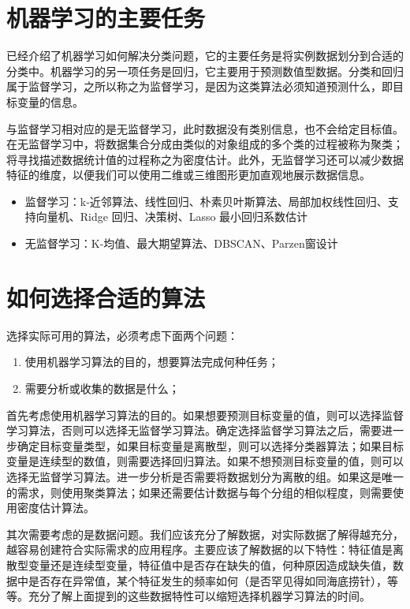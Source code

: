 \section{机器学习的主要任务}
已经介绍了机器学习如何解决分类问题，它的主要任务是将实例数据划分到合适的分类中。机器学习的另一项任务是回归，它主要用于预测数值型数据。分类和回归属于监督学习，之所以称之为监督学习，是因为这类算法必须知道预测什么，即目标变量的信息。

与监督学习相对应的是无监督学习，此时数据没有类别信息，也不会给定目标值。在无监督学习中，将数据集合分成由类似的对象组成的多个类的过程被称为聚类；将寻找描述数据统计值的过程称之为密度估计。此外，无监督学习还可以减少数据特征的维度，以便我们可以使用二维或三维图形更加直观地展示数据信息。

\begin{itemize}
    \item 监督学习：k-近邻算法、线性回归、朴素贝叶斯算法、局部加权线性回归、支持向量机、Ridge 回归、决策树、Lasso 最小回归系数估计
    \item 无监督学习：K-均值、最大期望算法、DBSCAN、Parzen窗设计
\end{itemize}
\section{如何选择合适的算法}
选择实际可用的算法，必须考虑下面两个问题：
\begin{enumerate}
    \item 使用机器学习算法的目的，想要算法完成何种任务；
    \item 需要分析或收集的数据是什么；
\end{enumerate}

首先考虑使用机器学习算法的目的。如果想要预测目标变量的值，则可以选择监督学习算法，否则可以选择无监督学习算法。确定选择监督学习算法之后，需要进一步确定目标变量类型，如果目标变量是离散型，则可以选择分类器算法；如果目标变量是连续型的数值，则需要选择回归算法。如果不想预测目标变量的值，则可以选择无监督学习算法。进一步分析是否需要将数据划分为离散的组。如果这是唯一的需求，则使用聚类算法；如果还需要估计数据与每个分组的相似程度，则需要使用密度估计算法。

其次需要考虑的是数据问题。我们应该充分了解数据，对实际数据了解得越充分，越容易创建符合实际需求的应用程序。主要应该了解数据的以下特性：特征值是离散型变量还是连续型变量，特征值中是否存在缺失的值，何种原因造成缺失值，数据中是否存在异常值，某个特征发生的频率如何（是否罕见得如同海底捞针），等等。充分了解上面提到的这些数据特性可以缩短选择机器学习算法的时间。


